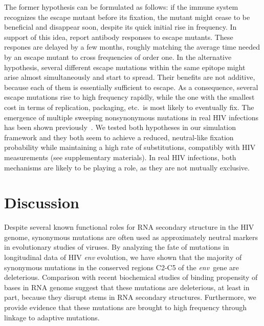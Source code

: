 \documentclass[rmp, twocolumn]{revtex4}
\newcommand{\env}{\textit{env}}
\begin{document}
The former hypothesis can be formulated as follows: if the immune system
recognizes the escape mutant before its fixation, the mutant might cease to be
beneficial and disappear soon, despite its quick initial rise in frequency. In support of this idea,
\citet{richman_rapid_2003, bunnik_autologous_2008} report antibody responses to
escape mutants. These respones are delayed by a few months, roughly matching the
average time needed by an escape mutant to cross frequencies of order one.
In the alternative hypothesis, several different escape
mutations within the same epitope might arise almost simultaneously and start to
spread. Their benefits are not additive, because each of them is
essentially sufficient to escape. As a consequence, several escape mutations rise to
high frequency rapidly, while the one with the smallest cost in terms of replication,
packaging, etc.~is most likely to eventually fix. The emergence of
multiple sweeping nonsynonymous mutations in real HIV infections has been shown
previously~\citep{moore_limited_2009, bar_early_2012}.
We tested both hypotheses in our simulation framework and they both seem to
achieve a reduced, neutral-like fixation probability while maintaining a high
rate of substitutions, compatibly with HIV measurements (see supplementary
materials).
In real HIV infections, both mechanisms are likely to be playing a role, as they
are not mutually exclusive.

\section{Discussion}
Despite several known functional roles for RNA secondary structure in the HIV
genome, synonymous mutations are often used as approximately neutral markers in
evolutionary studies of viruses. By analyzing the fate of mutations in
longitudinal data of HIV \env{} evolution, we have shown that the majority of
synonymous mutations in the conserved regions C2-C5 of the \env~gene are deleterious.
Comparison with recent biochemical studies of binding propensity of bases in RNA
genome suggest that these mutations are deleterious, at least in part, because they disrupt
stems in RNA secondary structures. Furthermore, we provide evidence that these
mutations are brought to high frequency through linkage to adaptive mutations.
\end{document}
